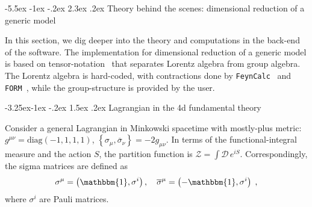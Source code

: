 \documentclass[11pt]{article}
\makeatletter
\newcommand*\ol[1]{\overline{#1}}
\renewcommand\section{\@startsection{section}{1}{\z@}%
  {-5.5ex \@plus -1ex \@minus -.2ex}%
  {2.3ex \@plus.2ex}%
  {\normalfont\large\bfseries}}
\renewcommand\subsection{\@startsection{subsection}{2}{\z@}%
  {-3.25ex\@plus -1ex \@minus -.2ex}%
  {1.5ex \@plus .2ex}%
  {\normalfont\normalsize\bfseries}}
\makeatother
\begin{document}
%
\section{Theory behind the scenes: dimensional reduction of a generic model}
\label{sec:theory}

In this section,
we dig deeper into the theory and computations in the back-end of the software.
The implementation for dimensional reduction of a generic model is based on
tensor-notation~\cite{%
  Martin:2017lqn,Martin:2018emo,Machacek:1984zw,Machacek:1983fi,Machacek:1983tz}
that separates Lorentz algebra from group algebra.
The Lorentz algebra is hard-coded, with contractions done by
{\tt FeynCalc}~\cite{Shtabovenko:2016sxi,Shtabovenko:2020gxv} and
{\tt FORM}~\cite{Ruijl:2017dtg,Croon:2020cgk}, while
the group-structure is provided by the user.


\subsection{Lagrangian in the 4d fundamental theory}

Consider a general Lagrangian in Minkowski spacetime with
mostly-plus metric: 
$g^{\mu \nu}=\mbox{diag}(-1,1,1,1)$,
$\left\{\sigma_\mu,\ol{\sigma}_\nu \right\}=-2 g_{\mu \nu}$.
In terms of
the functional-integral measure and
the action $S$, the partition function is
$\mathcal{Z}=\int \mathcal{D}\,e^{i S}$.
Correspondingly,
the sigma matrices are defined as
\begin{align}
  \sigma^{\mu}=\left(\mathbbm{1},\sigma^i\right),\quad
  \overline{\sigma}^{\mu}=\left(-\mathbbm{1},\sigma^i\right)
  \;,
\end{align}
where $\sigma^i$ are Pauli matrices.
\end{document}
